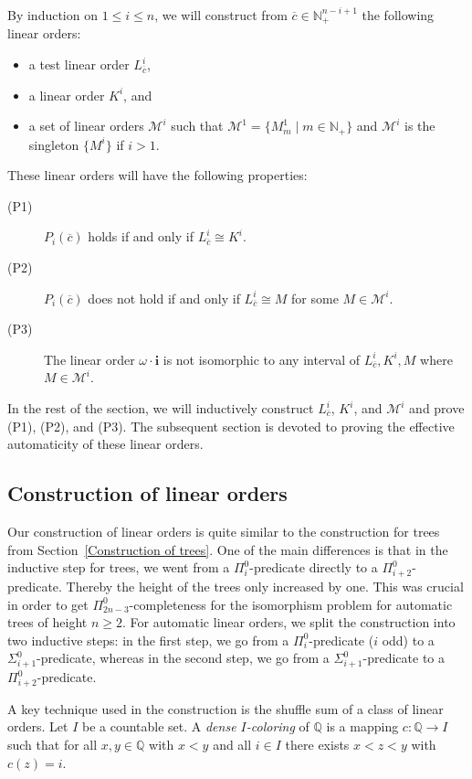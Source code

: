 \documentclass[envcountsame]{llncs}
\newcommand{\N}{\mathbb N}
\newcommand{\M}{\mathcal M}
\newcommand{\Q}{\mathbb Q}
\begin{document}
By induction on $1\leq i\leq n$, we will construct
from $\overline{c}\in \N_+^{n-i+1}$ the following linear orders:
\begin{itemize}
\item a test linear order $L^i_{\overline{c}}$,
\item a linear order $K^i$, and
\item a set of linear orders $\M^i$ such that $\M^1=\{M^1_m\mid m\in \N_+\}$ and $\M^i$ is the singleton $\{M^i\}$ if $i>1$.
\end{itemize}
These linear orders will have the following properties:
\begin{description}
\item[(P1)] $P_i(\overline c)$ holds if and only if
  $L^i_{\overline c} \cong K^i$.
\item[(P2)] $P_i(\overline c)$ does not hold if and only if $L^i_{\overline{c}}\cong M$ for some $M\in \M^i$.
\item[(P3)] The linear order $\omega\cdot \mathbf{i}$ is not isomorphic to any interval of $L^i_{\overline{c}}, K^i, M$ where $M\in \M^i$.
\end{description}
In the rest of the section, we will  inductively construct $L^i_{\overline{c}}$, $K^i$, and $\M^i$  
and prove (P1), (P2), and (P3). The subsequent section is devoted to proving the effective automaticity of these linear orders.



\subsection{Construction of linear orders}

Our construction of linear orders is quite similar to the construction
for trees from Section~\ref{Construction of trees}.  One of the main
differences is that in the inductive step for trees, we went from a
$\Pi^0_i$-predicate directly to a $\Pi^0_{i+2}$-predicate. Thereby the
height of the trees only increased by one.  This was crucial in order
to get $\Pi^0_{2n-3}$-completeness for the isomorphism problem for
automatic trees of height $n \geq 2$. For automatic linear orders, we
split the construction into two inductive steps: in the first step, we
go from a $\Pi^0_i$-predicate ($i$ odd) to a
$\Sigma^0_{i+1}$-predicate, whereas in the second step, we go from a
$\Sigma^0_{i+1}$-predicate to a $\Pi^0_{i+2}$-predicate.

A key technique used in the construction is the shuffle sum of a class of linear orders. 
Let $I$ be a countable set. A {\em dense $I$-coloring} of $\Q$ is a mapping $c:\Q\rightarrow I$ 
such that for all $x,y\in \Q$ with $x<y$ and all $i\in I$ there exists $x<z<y$ with $c(z)=i$.
\end{document}
